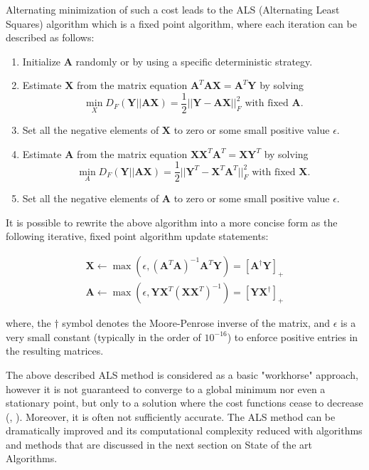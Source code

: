 \documentclass[11pt]{article}
\begin{document}
Alternating minimization of such a cost leads to the ALS (Alternating Least Squares)
algorithm which is a fixed point algorithm, where each iteration can be described as follows:

\begin{enumerate}
\item  Initialize $\mathbf{A}$ randomly or by using a specific deterministic strategy.
\item Estimate $\mathbf{X}$ from the matrix equation $\mathbf{A}^T\mathbf{AX} = \mathbf{A}^T\mathbf{Y}$ by solving
$$\min_X D_F(\mathbf{Y} || \mathbf{AX}) = \frac{1}{2} ||\mathbf{Y-AX}||_F^2 \textrm{ with fixed } \mathbf{A}.$$
\item Set all the negative elements of $\mathbf{X}$ to zero or some small positive value $\epsilon$.
\item Estimate $\mathbf{A}$ from the matrix equation $\mathbf{XX}^T\mathbf{A}^T = \mathbf{XY}^T$ by solving
$$\min_A D_F(\mathbf{Y} || \mathbf{AX}) = \frac{1}{2} ||\mathbf{Y}^T-\mathbf{X}^T\mathbf{A}^T||_F^2 \textrm{ with fixed } \mathbf{X}.$$
\item Set all the negative elements of $\mathbf{A}$ to zero or some small positive value $\epsilon$.
\end{enumerate}

It is possible to rewrite the above algorithm into a more concise form as the following iterative, fixed point algorithm update statements:

\begin{eqnarray}
\mathbf{X} \leftarrow \max(\epsilon, (\mathbf{A}^T\mathbf{A})^{-1}\mathbf{A}^T\mathbf{Y}) = [\mathbf{A}^{\dagger}\mathbf{Y}]_+ \\
\mathbf{A} \leftarrow \max(\epsilon, \mathbf{YX}^T(\mathbf{XX}^T)^{-1}) = [\mathbf{YX}^{\dagger}]_+
\end{eqnarray}

where, the $\dagger$ symbol denotes the Moore-Penrose inverse of the matrix, and $\epsilon$ is a very small constant (typically in the order of $10^{-16}$) to enforce positive entries in the resulting matrices.

The above described ALS method is considered as a basic "workhorse" approach, however it is not
guaranteed to converge to a global minimum nor even a stationary point, but only to a solution
where the cost functions cease to decrease (\cite{85}, \cite{11}). Moreover, it is often not sufficiently accurate. The ALS method can be dramatically improved and its computational complexity reduced with algorithms and methods that are discussed in the next section on State of the art Algorithms.
\end{document}
